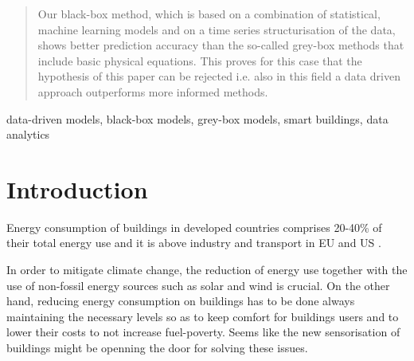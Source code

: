 \documentclass[10pt, conference, compsocconf]{IEEEtran}
\begin{document}
\begin{abstract}

Our black-box method, which is based on a combination of statistical, machine learning models and on a time series structurisation of the data, shows better prediction accuracy than the so-called grey-box methods that include basic physical equations. This proves for this case that the hypothesis of this paper can be rejected i.e. also in this field a data driven approach outperforms more informed methods.

\end{abstract}

\begin{IEEEkeywords}
data-driven models, black-box models, grey-box models, smart buildings, data analytics

\end{IEEEkeywords}


%
\IEEEpeerreviewmaketitle



\section{Introduction} \label{intro}

Energy consumption of buildings in developed countries comprises 20-40\% of their total energy use and it is above industry and transport in EU and US \cite{perez2008review, energyUS}. 

In order to mitigate climate change, the reduction of energy use together with the use of non-fossil energy sources such as solar and wind is crucial. On the other hand, reducing energy consumption on buildings has to be done always maintaining the necessary levels so as to keep comfort for buildings users and to lower their costs to not increase fuel-poverty. Seems like the new sensorisation of buildings might be openning the door for solving these issues.
\end{document}
